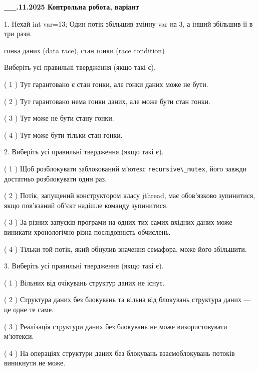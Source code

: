 \documentclass[12pt, ukrainian]{article}
\def\code#1{\Verb!#1!}
\begin{document}
\newpage
\begin {large}

\textbf{\_\_.11.2025 Контрольна робота, варіант  }\par


{
1. Нехай int var=13; Один потік збільшив змінну var на 3, а інший збільшив її в три рази.

гонка даних (data race), стан гонки (race condition)

Виберіть усі правильні твердження (якщо такі є).\par
\vspace{2mm}
( 1 ) Тут гарантовано є стан гонки, але гонки даних може не бути.%

( 2 ) Тут гарантовано нема гонки даних, але може бути стан гонки.%

( 3 ) Тут може не бути стану гонки.%

( 4 ) Тут може бути тільки стан гонки.%


2. Виберіть усі правильні твердження (якщо такі є).\par
\vspace{2mm}

( 1 ) Щоб розблокувати заблокований м’ютекс \code{recursive\_mutex}, його завжди достатньо розблокувати один раз.%

( 2 ) Потік, запущений конструктором класу jthread, має обов’язково зупинитися, якщо пов’язаний об’єкт надішле команду зупинитися.%

( 3 ) За різних запусків програми на одних тих самих вхідних даних може виникати хронологічно різна послідовність обчислень.%

( 4 ) Тільки той потік, який обнулив значення семафора, може його збільшити.%


3. Виберіть усі правильні твердження (якщо такі є).\par
\vspace{2mm}

( 1 ) Вільних від очікувань структур даних не існує.%

( 2 ) Структура даних без блокувань та вільна від блокувань структура даних --- це одне те саме.%

( 3 ) Реалізація структури даних без блокувань не може використовувати м’ютекси.%

( 4 ) На операціях структури даних без блокувань взаємоблокувань потоків виникнути не може.%


}
\end{large}
\end{document}
